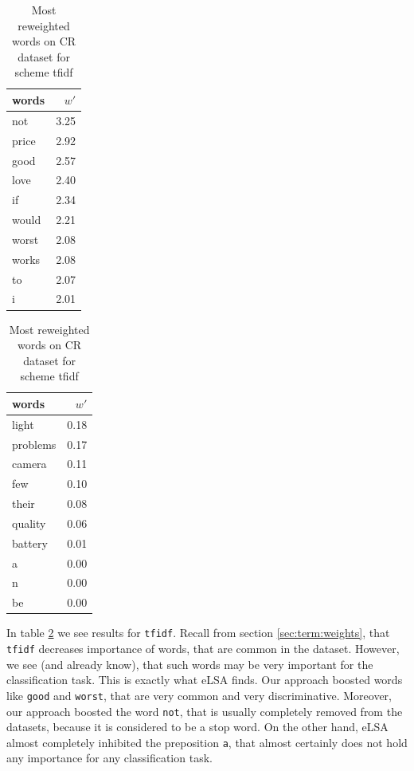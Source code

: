     
\begin{table}[h]
    \centering
    \begin{minipage}{.4\linewidth}
      \centering
        \begin{tabular}{lr}
\toprule
 words &  $w'$ \\
\midrule
   not &  3.25 \\
 price &  2.92 \\
  good &  2.57 \\
  love &  2.40 \\
    if &  2.34 \\
 would &  2.21 \\
 worst &  2.08 \\
 works &  2.08 \\
    to &  2.07 \\
     i &  2.01 \\
\bottomrule
\end{tabular}

    \end{minipage}
    \begin{minipage}{.4\linewidth}
      \centering
        \begin{tabular}{lr}
\toprule
    words &  $w'$ \\
\midrule
    light &  0.18 \\
 problems &  0.17 \\
   camera &  0.11 \\
      few &  0.10 \\
    their &  0.08 \\
  quality &  0.06 \\
  battery &  0.01 \\
        a &  0.00 \\
        n &  0.00 \\
       be &  0.00 \\
\bottomrule
\end{tabular}
    \end{minipage} 
    \caption{Most reweighted words on CR dataset for scheme tfidf}
    \label{tab:words:CR:tfidf}
\end{table}

    In table \ref{tab:words:CR:tfidf} we see results for \texttt{tfidf}. 
    Recall from section \ref{sec:term:weights}, that \texttt{tfidf} decreases importance of words, that are common in the dataset.
    However, we see (and already know), that such words may be very important for the classification task.
    This is exactly what eLSA finds. 
    Our approach boosted words like \texttt{good} and \texttt{worst}, that are very common and very discriminative.
    Moreover, our approach boosted the word \texttt{not}, that is usually completely removed from the datasets, because it is considered to be a stop word. 
    On the other hand, eLSA almost completely inhibited the preposition \texttt{a}, that almost certainly does not hold any importance for any classification task.



